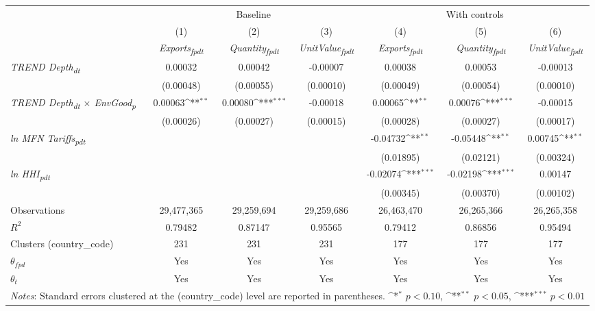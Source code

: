 {
\def\sym#1{\ifmmode^{#1}\else\(^{#1}\)\fi}
\begin{tabular}{l*{6}{c}}
\toprule
&\multicolumn{3}{c}{Baseline}&\multicolumn{3}{c}{With controls}\\\cmidrule(lr){2-4}\cmidrule(lr){5-7}
&(1)&(2)&(3)&(4)&(5)&(6)\\
&\textit{Exports\textsubscript{fpdt}}&\textit{Quantity\textsubscript{fpdt}}&\textit{UnitValue\textsubscript{fpdt}}&\textit{Exports\textsubscript{fpdt}}&\textit{Quantity\textsubscript{fpdt}}&\textit{UnitValue\textsubscript{fpdt}}\\
\midrule
\textit{TREND Depth\textsubscript{dt}} & 0.00032 & 0.00042 & -0.00007 & 0.00038 & 0.00053 & -0.00013\\
 & (0.00048) & (0.00055) & (0.00010) & (0.00049) & (0.00054) & (0.00010)\\
\addlinespace
\textit{TREND Depth\textsubscript{dt} $\times$ EnvGood\textsubscript{p}} & 0.00063\sym{**} & 0.00080\sym{***} & -0.00018 & 0.00065\sym{**} & 0.00076\sym{***} & -0.00015\\
 & (0.00026) & (0.00027) & (0.00015) & (0.00028) & (0.00027) & (0.00017)\\
\addlinespace
\textit{ln MFN Tariffs\textsubscript{pdt}} &  &  &  & -0.04732\sym{**} & -0.05448\sym{**} & 0.00745\sym{**}\\
 &  &  &  & (0.01895) & (0.02121) & (0.00324)\\
\addlinespace
\textit{ln HHI\textsubscript{pdt}} &  &  &  & -0.02074\sym{***} & -0.02198\sym{***} & 0.00147\\
 &  &  &  & (0.00345) & (0.00370) & (0.00102)\\
\midrule
Observations & 29,477,365 & 29,259,694 & 29,259,686 & 26,463,470 & 26,265,366 & 26,265,358\\
$R^{2}$ & 0.79482 & 0.87147 & 0.95565 & 0.79412 & 0.86856 & 0.95494\\
Clusters (country_code) & 231 & 231 & 231 & 177 & 177 & 177\\
$\theta_{fpd}$ & Yes & Yes & Yes & Yes & Yes & Yes\\
$\theta_{t}$ & Yes & Yes & Yes & Yes & Yes & Yes\\
\bottomrule
\multicolumn{7}{l}{\footnotesize \textit{Notes}: Standard errors clustered at the (country_code) level are reported in parentheses. \sym{*} \(p<0.10\), \sym{**} \(p<0.05\), \sym{***} \(p<0.01\)}\\
\end{tabular}
}
